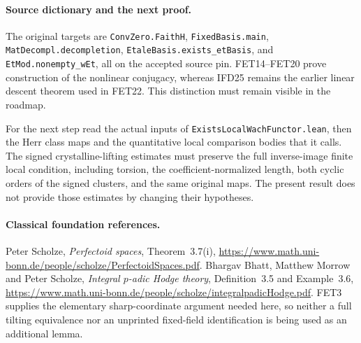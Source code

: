 \documentclass[11pt,a4paper]{article}
\numberwithin{equation}{section}
\theoremstyle{remark}\newtheorem{remark}[theorem]{Remark}
\begin{document}
\paragraph{Source dictionary and the next proof.}
The original targets are \texttt{Conv\allowbreak Zero.\allowbreak Faith\allowbreak H},
\texttt{Fixed\allowbreak Basis.\allowbreak main}, \texttt{Mat\allowbreak Decompl.\allowbreak decompletion},
\texttt{Etale\allowbreak Basis.\allowbreak exists\_\allowbreak et\allowbreak Basis}, and
\texttt{Et\allowbreak Mod.\allowbreak nonempty\_\allowbreak w\allowbreak Et}, all on the accepted source pin.
FET14--FET20 prove construction of the nonlinear conjugacy,
whereas IFD25 remains the earlier linear descent theorem used
in FET22. This distinction must remain visible in the roadmap.

For the next step read the actual inputs of
\texttt{Exists\allowbreak Local\allowbreak Wach\allowbreak Functor.\allowbreak lean}, then the Herr class maps
and the quantitative local comparison bodies that it calls.
The signed crystalline-lifting estimates must preserve the
full inverse-image finite local condition, including torsion,
the coefficient-normalized length, both cyclic orders of the
signed clusters, and the same original maps. The present result
does not provide those estimates by changing their hypotheses.

\paragraph{Classical foundation references.}
Peter Scholze, \emph{Perfectoid spaces}, Theorem~3.7(i),
\url{https://www.math.uni-bonn.de/people/scholze/PerfectoidSpaces.pdf}.
Bhargav Bhatt, Matthew Morrow and Peter Scholze,
\emph{Integral $p$-adic Hodge theory}, Definition~3.5 and
Example~3.6,
\url{https://www.math.uni-bonn.de/people/scholze/integralpadicHodge.pdf}.
FET3 supplies the elementary sharp-coordinate argument needed
here, so neither a full tilting equivalence nor an unprinted
fixed-field identification is being used as an additional lemma.

\endgroup
\end{document}
